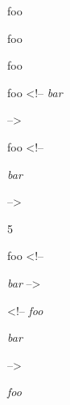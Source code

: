 
\def\mytitle{HTML Comments}


foo 

foo 

foo 

foo <!--
\emph{bar}

-->

foo <!--

\emph{bar}

-->

5

foo <!--

\emph{bar} -->

<!-- \emph{foo}

\emph{bar}

-->

\emph{foo}



